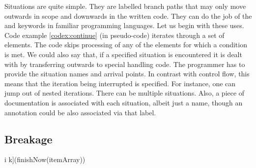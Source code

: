 \documentclass[10pt]{amsart}
\begin{document}
Situations are quite simple.  They are labelled branch paths that may
only move outwards in scope and downwards in the written code.  They
can do the job of the \texttt{} and \texttt{}
keywords in familiar programming languages.  Let us begin with these
uses.  Code example \ref{codex:continue} (in pseudo-code) iterates
through a set of elements.  The code skips processing of any of the
elements for which a condition is met.  We could also say that, if a
specified situation is encountered it is dealt with by transferring
outwards to special handling code.
%
The programmer has to provide the situation names and arrival points.
In contrast with \texttt{} control flow, this means that
the iteration being interrupted is specified.  For instance, one can
jump out of nested iterations.  There can be multiple situations.
Also, a piece of documentation is associated with each situation,
albeit just a name, though an annotation could be also associated via
that label.


\subsection{Breakage}


\begin{codex}
\begin{offsideBlue}
\begin{PVerbatim}
  \ckw[block]\cop[:]
     \ckw[loop] i \ckw[through] \cbrack[0\cop[:]k]\cop[:]
        \ckw[if] (finishNow(itemArray\cbrack[i]))\cop[:]
           \cgoto\csituation[ProcessingDoneEarly]
        \cend
     \cend
  \csitop\csituation[ProcessingDoneEarly]\cop[:]
  \cend
\end{PVerbatim}
\end{offsideBlue}
\end{codex}
\end{document}
